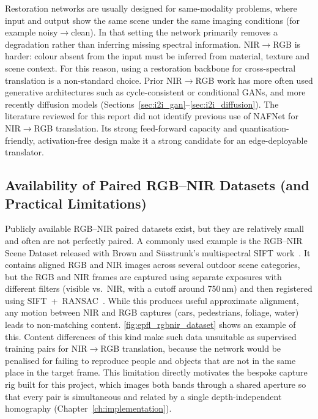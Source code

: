 Restoration networks are usually designed for same-modality problems, where input and output show the same scene under the same imaging conditions (for example noisy$\rightarrow$clean). In that setting the network primarily removes a degradation rather than inferring missing spectral information. NIR$\rightarrow$RGB is harder: colour absent from the input must be inferred from material, texture and scene context. For this reason, using a restoration backbone for cross-spectral translation is a non-standard choice. Prior NIR$\rightarrow$RGB work has more often used generative architectures such as cycle-consistent or conditional GANs, and more recently diffusion models (Sections~\ref{sec:i2i_gan}--\ref{sec:i2i_diffusion}). The literature reviewed for this report did not identify previous use of NAFNet for NIR$\rightarrow$RGB translation. Its strong feed-forward capacity and quantisation-friendly, activation-free design make it a strong candidate for an edge-deployable translator.

\subsection{Availability of Paired RGB--NIR Datasets (and Practical Limitations)}
\label{sec:datasets}

Publicly available RGB--NIR paired datasets exist, but they are relatively small and often are not perfectly paired. A commonly used example is the RGB--NIR Scene Dataset released with Brown and S\"usstrunk's multispectral SIFT work~\cite{brown2011multispectral,epfl_rgbnir_dataset}. It contains aligned RGB and NIR images across several outdoor scene categories, but the RGB and NIR frames are captured using separate exposures with different filters (visible vs.\ NIR, with a cutoff around 750\,nm) and then registered using SIFT~+~RANSAC~\cite{epfl_rgbnir_dataset}. While this produces useful approximate alignment, any motion between NIR and RGB captures (cars, pedestrians, foliage, water) leads to non-matching content. \autoref{fig:epfl_rgbnir_dataset} shows an example of this. Content differences of this kind make such data unsuitable as supervised training pairs for NIR$\rightarrow$RGB translation, because the network would be penalised for failing to reproduce people and objects that are not in the same place in the target frame. This limitation directly motivates the bespoke capture rig built for this project, which images both bands through a shared aperture so that every pair is simultaneous and related by a single depth-independent homography (Chapter~\ref{ch:implementation}).

